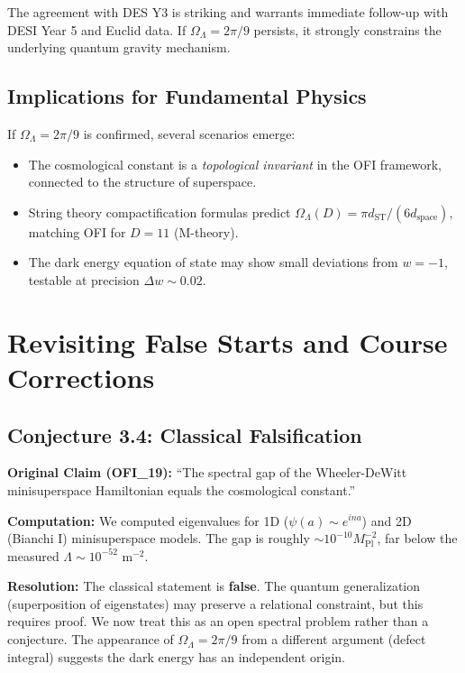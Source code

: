\documentclass[12pt,a4paper]{article}
\theoremstyle{definition}
\begin{document}
The agreement with DES Y3 is striking and warrants immediate follow-up with DESI Year 5 and Euclid data. If $\Omega_\Lambda = 2\pi/9$ persists, it strongly constrains the underlying quantum gravity mechanism.

\subsection{Implications for Fundamental Physics}

If $\Omega_\Lambda = 2\pi/9$ is confirmed, several scenarios emerge:
\begin{itemize}
\item The cosmological constant is a \textit{topological invariant} in the OFI framework, connected to the structure of superspace.
\item String theory compactification formulas predict $\Omega_\Lambda(D) = \pi d_{\text{ST}}/(6 d_{\text{space}})$, matching OFI for $D=11$ (M-theory).
\item The dark energy equation of state may show small deviations from $w = -1$, testable at precision $\Delta w \sim 0.02$.
\end{itemize}

\newpage

\section{Revisiting False Starts and Course Corrections}

\subsection{Conjecture 3.4: Classical Falsification}

\begin{tcolorbox}[colback=red!20,colframe=red!75!black,title=Honesty Box: Course Correction on Spectral Gap]
\textbf{Original Claim (OFI\_19):} ``The spectral gap of the Wheeler-DeWitt minisuperspace Hamiltonian equals the cosmological constant.''

\textbf{Computation:} We computed eigenvalues for 1D ($\psi(a) \sim e^{ina}$) and 2D (Bianchi I) minisuperspace models. The gap is roughly $\sim 10^{-10} M_{\text{Pl}}^{-2}$, far below the measured $\Lambda \sim 10^{-52}$ m$^{-2}$.

\textbf{Resolution:} The classical statement is \textbf{false}. The quantum generalization (superposition of eigenstates) may preserve a relational constraint, but this requires proof. We now treat this as an open spectral problem rather than a conjecture. The appearance of $\Omega_\Lambda = 2\pi/9$ from a different argument (defect integral) suggests the dark energy has an independent origin.
\end{tcolorbox}
\end{document}

